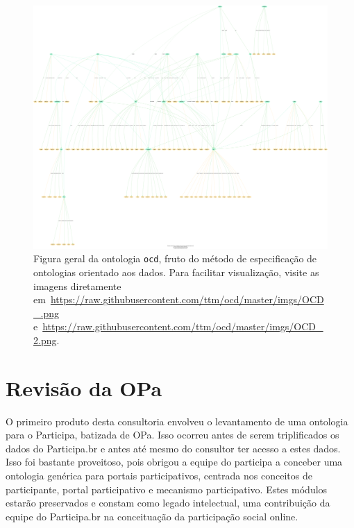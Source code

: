 \documentclass[12pt]{article}
\begin{document}
\begin{figure}[h!]
  \centering
    \includegraphics[width=\textwidth]{../figs/OCD_2.png}
  \caption{Figura geral da ontologia \texttt{ocd}, fruto do método de especificação de ontologias orientado aos dados. Para facilitar visualização, visite as imagens diretamente em~\url{https://raw.githubusercontent.com/ttm/ocd/master/imgs/OCD_.png} e~\url{https://raw.githubusercontent.com/ttm/ocd/master/imgs/OCD_2.png}.}\label{fig:ocdg}
\end{figure}


\section{Revisão da OPa}\label{ap:opa}
O primeiro produto desta consultoria envolveu o levantamento de uma ontologia para o Participa, batizada de OPa. Isso ocorreu antes de serem triplificados os dados do Participa.br e antes até mesmo do consultor ter acesso a estes dados. Isso foi bastante proveitoso, pois obrigou a equipe do participa a conceber uma ontologia genérica para portais participativos, centrada nos conceitos de participante, portal participativo e mecanismo participativo. Estes módulos estarão preservados e constam como legado intelectual, uma contribuição da equipe do Participa.br na conceituação da participação social online.
\end{document}
